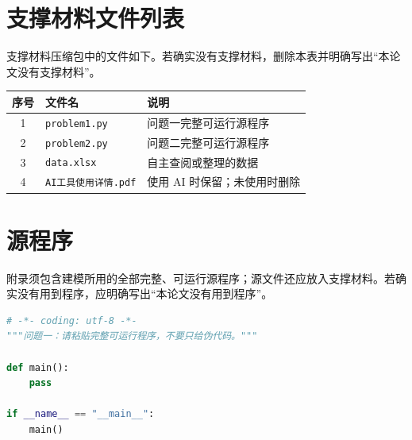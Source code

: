 \documentclass[withoutpreface,bwprint]{cumcmthesis}
\begin{document}
\begin{appendices}

\section{支撑材料文件列表}

支撑材料压缩包中的文件如下。若确实没有支撑材料，删除本表并明确写出“本论文没有支撑材料”。

\begin{center}
\begin{tabular}{cll}
  \toprule
  序号 & 文件名 & 说明 \\
  \midrule
  1 & \texttt{problem1.py} & 问题一完整可运行源程序 \\
  2 & \texttt{problem2.py} & 问题二完整可运行源程序 \\
  3 & \texttt{data.xlsx} & 自主查阅或整理的数据 \\
  4 & \texttt{AI工具使用详情.pdf} & 使用 AI 时保留；未使用时删除 \\
  \bottomrule
\end{tabular}
\end{center}

\section{源程序}

附录须包含建模所用的全部完整、可运行源程序；源文件还应放入支撑材料。若确实没有用到程序，应明确写出“本论文没有用到程序”。

\begin{lstlisting}[language=Python,caption={问题一源程序（替换为完整可运行代码）}]
# -*- coding: utf-8 -*-
"""问题一：请粘贴完整可运行程序，不要只给伪代码。"""

def main():
    pass

if __name__ == "__main__":
    main()
\end{lstlisting}

\end{appendices}
\end{document}
